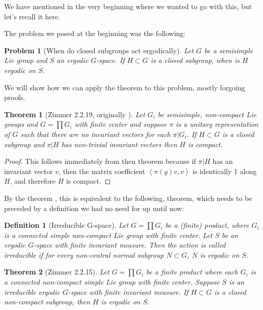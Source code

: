 \documentclass[
  12pt
]{article}
\numberwithin{equation}{section}
\newtheorem{thm}{Theorem}[section]
\newtheorem{defn}{Definition}[thm]
\newtheorem*{problem}{Problem}
\theoremstyle{plain}
\newtheorem*{proof}{Proof}
\newcommand{\G}{\ensuremath{G}\xspace}
\newcommand{\mpi}{\ensuremath{\pi}\xspace}
\newcommand{\inn}[1]{\left\langle #1 \right\rangle}
\begin{document}
  We have mentioned in the very beginning where we wanted to go with this, but let's recall it here.

  The problem we posed at the beginning was the following:

  \begin{problem}[When do closed subgroups act ergodically]
    Let \G be a semisimple Lie group and $S$ an ergodic \G-space. If $H\subset G$ is a closed subgroup, when is $H$ ergodic on $S$.
  \end{problem}

  We will show how we can apply the theorem to this problem, mostly forgoing proofs.

  \begin{thm}[Zimmer 2.2.19, originally \citeauthor{Moore66}\cite{Moore66}]
    \label{thm:2.2.19}
     Let $G_i$ be semisimple, non-compact Lie groups and $G = \prod G_i$ with finite center and
     suppose \mpi is a unitary representation of
     \G such that there are no invariant vectors for each $\pi|G_i$. If $H
     \subset G$ is a closed subgroup and $\pi|H$ has non-trivial invariant
     vectors then $H$ is compact.
  \end{thm}

  \begin{proof}
    This follows immediately from then theorem because if $\pi|H$ has an invariant vector $v$, then the matrix coefficient $\inn{\pi(g)v,v}$ is identically 1 along $H$, and therefore $H$ is compact.
  \end{proof}


  By the theorem , this is equivalent to the following,
  theorem, which needs to be preceded by a definition we had no need for up
  until now:

  \begin{defn}[Irreducible G-space]
    Let $G = \prod G_i$ be a (finite) product, where $G_i$ is a connected
    simple non-compact Lie group with finite center.
    Let $S$ be an ergodic \G-space with finite invariant measure.
    Then the action is called \emph{irreducible} if for every non-central normal subgroup
    $N \subset G$, $N$ is ergodic on $S$.
  \end{defn}


  \begin{thm}[Zimmer 2.2.15]
    \label{thm:2.2.15}
    Let $G = \prod G_i$ be a finite product where each $G_i$ is a connected
    non-compact simple Lie group with finite center. Suppose $S$ is an
    irreducible ergodic \G-space with finite invariant measure. If $H \subset
    G$ is a closed non-compact subgroup, then $H$ is ergodic on $S$.
  \end{thm}
\end{document}
